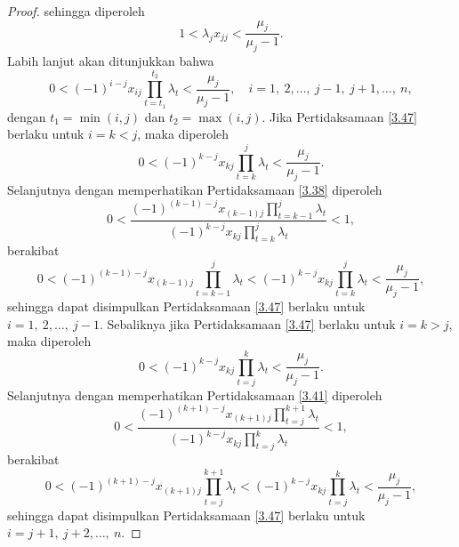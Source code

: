 \begin{proof}
    sehingga diperoleh
    \begin{equation}
        1 < \lambda_jx_{jj} < \frac{\mu_j}{\mu_j - 1}.
    \end{equation}
    Labih lanjut akan ditunjukkan bahwa
    \begin{equation}\label{3.47}
        0 <(-1)^{i-j}x_{ij} \prod_{t=t_1}^{t_2}{\lambda_t}<\frac{\mu_{j}}{\mu_j - 1}, \quad i=1,~2,\dots,~j-1,~j+1,\dots,~n,
    \end{equation}
    dengan $t_1=\min(i,j)$ dan $t_2=\max(i,j)$. Jika Pertidaksamaan \eqref{3.47} berlaku untuk $i=k<j$, maka diperoleh
    \begin{equation*}
        0 <(-1)^{k-j}x_{kj} \prod_{t=k}^{j}{\lambda_t}<\frac{\mu_{j}}{\mu_j - 1}.
    \end{equation*}
    Selanjutnya dengan memperhatikan Pertidaksamaan \eqref{3.38} diperoleh
    \begin{equation*}
        0 <\frac{(-1)^{(k-1)-j}x_{(k-1)j} \prod_{t=k-1}^{j}{\lambda_t}}{(-1)^{k-j}x_{kj} \prod_{t=k}^{j}{\lambda_t}}<1,
    \end{equation*}
    berakibat
    \begin{equation*}
        0 <(-1)^{(k-1)-j}x_{(k-1)j} \prod_{t=k-1}^{j}{\lambda_t}<(-1)^{k-j}x_{kj} \prod_{t=k}^{j}{\lambda_t}<\frac{\mu_{j}}{\mu_j - 1},
    \end{equation*}
    sehingga dapat disimpulkan Pertidaksamaan \eqref{3.47} berlaku untuk $i=1,~2,\dots,~j-1$. Sebaliknya jika Pertidaksamaan \eqref{3.47} berlaku untuk $i=k>j$, maka diperoleh
    \begin{equation*}
        0 <(-1)^{k-j}x_{kj} \prod_{t=j}^{k}{\lambda_t}<\frac{\mu_{j}}{\mu_j - 1}.
    \end{equation*}
    Selanjutnya dengan memperhatikan Pertidaksamaan \eqref{3.41} diperoleh
    \begin{equation*}
        0 <\frac{(-1)^{(k+1)-j}x_{(k+1)j} \prod_{t=j}^{k+1}{\lambda_t}}{(-1)^{k-j}x_{kj} \prod_{t=j}^{k}{\lambda_t}}<1,
    \end{equation*}
    berakibat
    \begin{equation*}
        0 <(-1)^{(k+1)-j}x_{(k+1)j} \prod_{t=j}^{k+1}{\lambda_t}<(-1)^{k-j}x_{kj} \prod_{t=j}^{k}{\lambda_t}<\frac{\mu_{j}}{\mu_j - 1},
    \end{equation*}
    sehingga dapat disimpulkan Pertidaksamaan \eqref{3.47} berlaku untuk $i=j+1,~j+2,\dots,~n$.
\end{proof}

